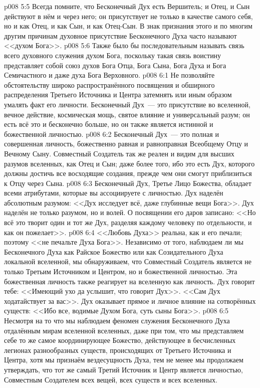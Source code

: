 \vs p008 5:5 Всегда помните, что Бесконечный Дух есть  Вершитель; и Отец, и Сын действуют в нём и через него; он присутствует не только в качестве самого себя, но и как Отец, и как Сын, и как Отец\hyp{}Сын. В знак признания этого и по многим другим причинам духовное присутствие Бесконечного Духа часто называют <<духом Бога>>.
\vs p008 5:6 Также было бы последовательным называть связь всего духовного служения духом Бога, поскольку такая связь воистину представляет собой союз духов Бога Отца, Бога Сына, Бога Духа и Бога Семичастного и даже духа Бога Верховного.
\vs p008 6:1 Не позволяйте обстоятельству широко распространённого посвящения и обширного распределения Третьего Источника и Центра затемнять или иным образом умалять факт его личности. Бесконечный Дух~--- это присутствие во вселенной, вечное действие, космическая мощь, святое влияние и универсальный разум; он есть всё это и бесконечно больше, но он также является истинной и божественной личностью.
\vs p008 6:2 Бесконечный Дух~--- это полная и совершенная личность, божественно равная и равноправная Всеобщему Отцу и Вечному Сыну. Совместный Создатель так же реален и видим для высших разумов вселенных, как Отец и Сын; даже более того, ибо это есть Дух, которого должны достичь все восходящие создания, прежде чем они смогут приблизиться к Отцу через Сына.
\vs p008 6:3 Бесконечный Дух, Третье Лицо Божества, обладает всеми атрибутами, которые вы ассоциируете с личностью. Дух наделён абсолютным разумом: <<Дух исследует всё, даже глубинные вещи Бога>>. Дух наделён не только разумом, но и волей. О посвящении его даров записано: <<Но всё это творит один и тот же Дух, разделяя каждому человеку по отдельности, и как он пожелает>>.
\vs p008 6:4 <<Любовь Духа>> реальна, как и его печали; поэтому <<не печальте Духа Бога>>. Независимо от того, наблюдаем ли мы Бесконечного Духа как Райское Божество или как Созидательного Духа локальной вселенной, мы обнаруживаем, что Совместный Создатель является не только Третьим Источником и Центром, но и божественной личностью. Эта божественная личность также реагирует на вселенную как личность. Дух говорит тебе: <<Имеющий ухо да услышит, что говорит Дух>>. <<Сам Дух ходатайствует за вас>>. Дух оказывает прямое и личное влияние на сотворённых существ: <<Ибо все, водимые Духом Бога, суть сыны Бога>>.
\vs p008 6:5 Несмотря на то что мы наблюдаем феномен служения Бесконечного Духа отдалённым мирам вселенной вселенных, даже при том, что мы представляем себе то же самое координирующее Божество, действующее в бесчисленных легионах разнообразных существ, происходящих от Третьего Источника и Центра, хотя мы признаём вездесущность Духа, тем не менее мы продолжаем утверждать, что тот же самый Третий Источник и Центр является личностью, Совместным Создателем всех вещей, всех существ и всех вселенных.
